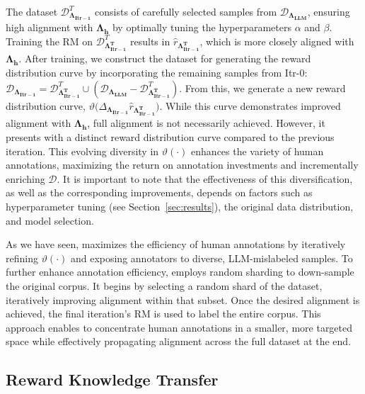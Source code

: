 The dataset $\mathcal{D}_{\mathbf{\Lambda_{Itr-1}}}^{T}$ consists of carefully selected samples from $\mathcal{D}_{\mathbf{\Lambda_{LLM}}}$, ensuring high alignment with $\mathbf{\Lambda_{h}}$ by optimally tuning the hyperparameters $\alpha$ and $\beta$. Training the RM on $\mathcal{D}_{\mathbf{\Lambda_{Itr-1}^{T}}}^{T}$ results in $\hat{r}_\mathbf{\Lambda_{Itr-1}^{T}}$, which is more closely aligned with $\mathbf{\Lambda_{h}}$. After training, we construct the dataset for generating the reward distribution curve by incorporating the remaining samples from Itr-0: $\mathcal{D}_{\mathbf{\Lambda_{Itr-1}}} = \mathcal{D}_{\mathbf{\Lambda_{Itr-1}^{T}}}^{T} \cup (\mathcal{D}_{\mathbf{\Lambda_{LLM}}} - \mathcal{D}_{\mathbf{\Lambda_{Itr-1}^{T}}}^{T})$. From this, we generate a new reward distribution curve, $\vartheta(\Delta_{\mathbf{\Lambda_{Itr-1}}}{\hat{r}_\mathbf{\Lambda_{Itr-1}^{T}})}$. While this curve demonstrates improved alignment with $\mathbf{\Lambda_{h}}$, full alignment is not necessarily achieved. However, it presents \myname{} with a distinct reward distribution curve compared to the previous iteration. This evolving diversity in $\vartheta(\cdot)$ enhances the variety of human annotations, maximizing the return on annotation investments and incrementally enriching $\mathcal{D}$. It is important to note that the effectiveness of this diversification, as well as the corresponding improvements, depends on factors such as hyperparameter tuning (see Section~\ref{sec:results}), the original data distribution, and model selection.

As we have seen, \myname{} maximizes the efficiency of human annotations by iteratively refining $\vartheta(\cdot)$ and exposing annotators to diverse, LLM-mislabeled samples. To further enhance annotation efficiency, \myname{} employs random sharding to down-sample the original corpus. It begins by selecting a random shard of the dataset, iteratively improving alignment within that subset. Once the desired alignment is achieved, the final iteration's RM is used to label the entire corpus. This approach enables \myname{} to concentrate human annotations in a smaller, more targeted space while effectively propagating alignment across the full dataset at the end. 

\vspace{-0.1in}
\subsection{Reward Knowledge Transfer}
\vspace{-0.05in}

